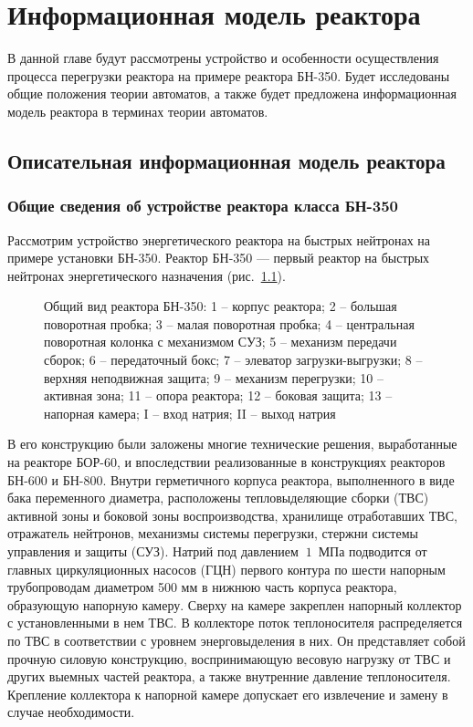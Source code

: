 \chapter{Информационная модель реактора} \label{model}

В данной главе будут рассмотрены устройство и особенности осуществления процесса перегрузки реактора на примере реактора БН-350.
Будет исследованы общие положения теории автоматов, а также будет предложена информационная модель реактора в терминах теории автоматов.

\section{Описательная информационная модель реактора} \label{BN}
\subsection{Общие сведения об устройстве реактора класса БН-350} 
Рассмотрим устройство энергетического реактора на быстрых нейтронах на примере установки БН-350.
Реактор БН-350 --- первый реактор на быстрых нейтронах энергетического  назначения (рис.~\ref{pic:basic-view}).
\begin{figure}[p]
\caption[Общий вид реактора БН-350]{Общий вид реактора БН-350: 1 -- корпус реактора; 2 -- большая поворотная пробка; 3 -- малая поворотная пробка; 4 -- центральная поворотная колонка с механизмом СУЗ; 5 -- механизм передачи сборок; 6 -- передаточный бокс; 7 -- элеватор загрузки-выгрузки; 8 -- верхняя неподвижная защита; 9 -- механизм перегрузки; 10 -- активная зона; 11 -- опора реактора; 12 -- боковая защита; 13 -- напорная камера; I -- вход натрия; II -- выход натрия}
\label{pic:basic-view}
\end{figure}
В его конструкцию были заложены многие технические решения, выработанные на реакторе БОР-60, и впоследствии реализованные в конструкциях реакторов БН-600 и БН-800.
Внутри герметичного корпуса реактора, выполненного в виде бака переменного диаметра, расположены тепловыделяющие сборки (ТВС) активной зоны и боковой зоны воспроизводства, хранилище отработавших ТВС, отражатель нейтронов, механизмы системы перегрузки, стержни системы управления и защиты (СУЗ).
Натрий под давлением $~1$~МПа подводится от главных циркуляционных насосов (ГЦН) первого контура по шести напорным трубопроводам диаметром 500 мм в нижнюю часть корпуса реактора, образующую напорную камеру.
Сверху на камере закреплен напорный коллектор с установленными в нем ТВС.
В коллекторе поток теплоносителя распределяется по ТВС в соответствии с уровнем энерговыделения в них.
Он представляет собой прочную силовую конструкцию, воспринимающую весовую нагрузку от ТВС и других выемных частей реактора, а также внутренние давление теплоносителя.
Крепление коллектора к напорной камере допускает его извлечение и замену в случае необходимости.

